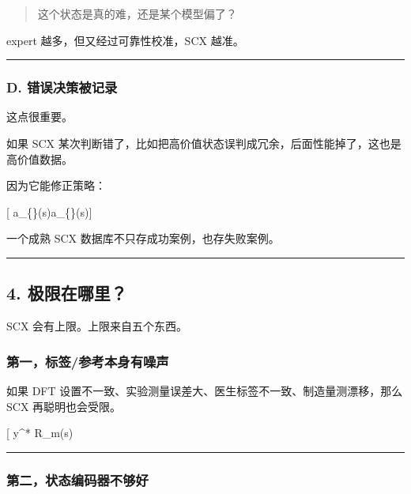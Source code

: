 \documentclass[
  12pt,
]{ctexart}
\begin{document}
\begin{quote}
这个状态是真的难，还是某个模型偏了？
\end{quote}

expert 越多，但又经过可靠性校准，SCX 越准。

\begin{center}\rule{0.5\linewidth}{0.5pt}\end{center}

\subsubsection{D.
错误决策被记录}\label{d.-ux9519ux8befux51b3ux7b56ux88abux8bb0ux5f55}

这点很重要。

如果 SCX
某次判断错了，比如把高价值状态误判成冗余，后面性能掉了，这也是高价值数据。

因为它能修正策略：

{[} a\_\{\}(s)\rightarrow a\_\{\}(s){]}

一个成熟 SCX 数据库不只存成功案例，也存失败案例。

\begin{center}\rule{0.5\linewidth}{0.5pt}\end{center}

\subsection{4. 极限在哪里？}\label{ux6781ux9650ux5728ux54eaux91cc}

SCX 会有上限。上限来自五个东西。

\subsubsection{第一，标签/参考本身有噪声}\label{ux7b2cux4e00ux6807ux7b7eux53c2ux8003ux672cux8eabux6709ux566aux58f0}

如果 DFT 设置不一致、实验测量误差大、医生标签不一致、制造量测漂移，那么
SCX 再聪明也会受限。

{[} y\^{}*  \Rightarrow R\_m(s) \text{ 不可能完全准}{]}

\begin{center}\rule{0.5\linewidth}{0.5pt}\end{center}

\subsubsection{第二，状态编码器不够好}\label{ux7b2cux4e8cux72b6ux6001ux7f16ux7801ux5668ux4e0dux591fux597d}
\end{document}
